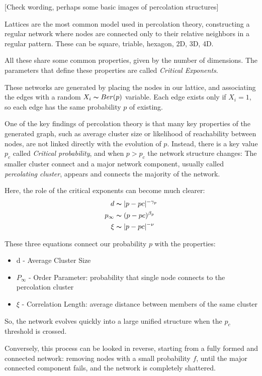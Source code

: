 \documentclass[
]{article}
\begin{document}
{[}Check wording, perhaps some basic images of percolation structures{]}

Lattices are the most common model used in percolation theory,
constructing a regular network where nodes are connected only to their
relative neighbors in a regular pattern. These can be square, triable,
hexagon, 2D, 3D, 4D.

All these share some common properties, given by the number of
dimensions. The parameters that define these properties are called
\emph{Critical Exponents}.

These networks are generated by placing the nodes in our lattice, and
associating the edges with a random \(X_i \thicksim Ber(p)\) variable.
Each edge exists only if \(X_i = 1\), so each edge has the same
probability \(p\) of existing.

One of the key findings of percolation theory is that many key
properties of the generated graph, such as average cluster size or
likelihood of reachability between nodes, are not linked directly with
the evolution of \(p\). Instead, there is a key value \(p_c\) called
\emph{Critical probability}, and when \(p>p_c\) the network structure
changes: The smaller cluster connect and a major network component,
usually called \emph{percolating cluster}, appears and connects the
majority of the network.

Here, the role of the critical exponents can become much clearer: \[
\begin{aligned}
d &\thicksim \lvert p-pc \lvert ^{-\gamma_p} \\
p_{\infty}&\thicksim(p-pc)^{\beta_p} \\
\xi&\thicksim \lvert p-pc \lvert ^{-\nu}
\end{aligned}
\]

These three equations connect our probability \(p\) with the properties:

\begin{itemize}
\item
  d - Average Cluster Size
\item
  \(P_\infty\) - Order Parameter: probability that single node connects
  to the percolation cluster
\item
  \(\xi\) - Correlation Length: average distance between members of the
  same cluster
\end{itemize}

So, the network evolves quickly into a large unified structure when the
\(p_c\) threshold is crossed.

Conversely, this process can be looked in reverse, starting from a fully
formed and connected network: removing nodes with a small probability
\(f\), until the major connected component fails, and the network is
completely shattered.
\end{document}

